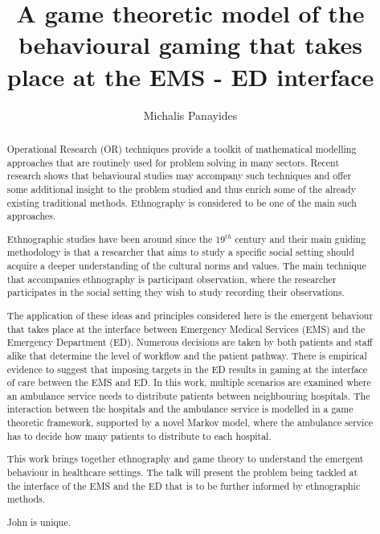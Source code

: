 \documentclass{article}
\title{A game theoretic model of the behavioural gaming that takes place at the EMS
 - ED interface}
\author{Michalis Panayides}
\begin{document}
\maketitle
\begin{abstract}
    Operational Research (OR) techniques provide a toolkit of mathematical 
    modelling approaches that are routinely used for problem solving in many
    sectors. Recent research shows that behavioural studies may accompany such
    techniques and offer some additional insight to the problem studied and 
    thus enrich some of the already existing traditional methods. Ethnography is 
    considered to be one of the main such approaches.

    Ethnographic studies have been around since the \(19^{th}\) century and
    their main guiding methodology is that a researcher that aims to study 
    a specific social setting should acquire a deeper understanding of the 
    cultural norms and values. The main technique that accompanies ethnography 
    is participant observation, where the researcher participates in the social 
    setting they wish to study recording their observations.

    The application of these ideas and principles considered here is the emergent 
    behaviour that takes place at the interface between Emergency Medical Services 
    (EMS) and the Emergency Department (ED). Numerous decisions are taken by both 
    patients and staff alike that determine the level of workflow and the patient 
    pathway. There is empirical evidence to suggest that imposing targets in the ED 
    results in gaming at the interface of care between the EMS and ED. In this work,
    multiple scenarios are examined where an ambulance service needs to distribute 
    patients between neighbouring hospitals. The interaction between the hospitals 
    and the ambulance service is modelled in a game theoretic framework, supported by 
    a novel Markov model, where the ambulance service has to decide how many patients 
    to distribute to each hospital.

    This work brings together ethnography and game theory to understand the emergent
    behaviour in healthcare settings. The talk will present the problem being tackled
    at the interface of the EMS and the ED that is to be further informed by ethnographic methods.
        
    John is unique. 
\end{abstract}
    
\end{document}
